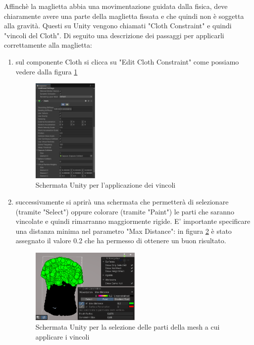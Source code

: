 \documentclass[11pt]{report}
\begin{document}
Affinchè la maglietta abbia una movimentazione guidata dalla fisica, deve chiaramente avere una parte della maglietta fissata e che quindi non è soggetta alla gravità. Questi su Unity vengono chiamati "Cloth Constraint" e quindi "vincoli del Cloth".
Di seguito una descrizione dei passaggi per applicarli correttamente alla maglietta:
\begin{enumerate}
    \item sul componente Cloth si clicca su "Edit Cloth Constraint" come possiamo vedere dalla figura \ref{fig:cloth_constraints}
    \begin{figure}[h!]
        \centering
        \includegraphics[width=0.3\textwidth]{images/cloth_constraints.PNG}
        \caption{Schermata Unity per l'applicazione dei vincoli}
        \label{fig:cloth_constraints}
    \end{figure}
    \item successivamente si aprirà una schermata che permetterà di selezionare (tramite "Select") oppure colorare (tramite "Paint") le parti che saranno vincolate e quindi rimarranno maggiormente rigide. E' importante specificare una distanza minima nel parametro "Max Distance": in figura \ref{fig:cloth_constraints_2} è stato assegnato il valore 0.2 che ha permesso di ottenere un buon risultato.
    \begin{figure}[h!]
        \centering
        \includegraphics[width=0.5\textwidth]{images/cloth_constraints_2.PNG}
        \caption{Schermata Unity per la selezione delle parti della mesh a cui applicare i vincoli}
        \label{fig:cloth_constraints_2}
    \end{figure}
\end{enumerate}
\end{document}
